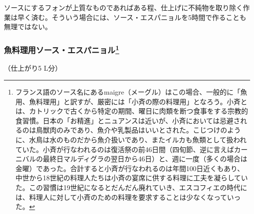 \begin{recette}
ソースにするフォンが上質なものであればある程、仕上げに不純物を取り除く作業は早く済む。そういう場合には、ソース・エスパニョルを5時間で作ることも無理ではない。

\atoaki{}

\hypertarget{sauce-espagnole-maigre}{%
\subsubsection[魚料理用ソース・エスパニョル]{\texorpdfstring{魚料理用ソース・エスパニョル\footnote{フランス語のソース名にあるmaigre（メーグル）はこの場合、一般的に「魚用、魚料理用」と訳すが、厳密には「小斉の際の料理用」となろう。小斉とは、カトリックで古くから特定の期間、曜日に肉類を断つ食事をする宗教的食習慣。日本の「お精進」とニュアンスは近いが、小斉においては忌避されるのは鳥獣肉のみであり、魚介や乳製品はいいとされた。こじつけのように、水鳥は水のものだから魚介扱いであり、またイルカも魚類として扱われていた。小斉が行なわれるのは復活祭の前46日間（四旬節、逆に言えばカーニバルの最終日マルディグラの翌日から46日）と、週に一度（多くの場合は金曜）であった。合計すると小斉が行なわれるのは年間100日近くもあり、中世から18世紀の料理人たちは小斉の宴席に供する料理に工夫を凝らしていた。この習慣は19世紀になるとだんだん廃れていき、エスコフィエの時代には、料理人に対して小斉のための料理を要求することは少なくなっていった。}}{魚料理用ソース・エスパニョル}}\label{sauce-espagnole-maigre}}



（仕上がり5 L分）


\end{recette}
